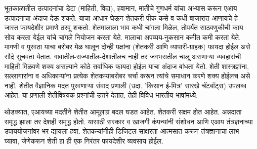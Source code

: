 भूतकाळातील उत्पादनांचा डेटा (माहिती, विदा), हवामान, मातीचे गुणधर्म यांचा अभ्यास करून एआय उत्पादनाचा अंदाज देऊ शकते. याचा आधार घेऊन शेतकरी पीक कसे व कधी बाजारात आणायचे हे जास्त फायदेशीर प्रमाणे ठरवू शकतो. शेतमालाला भाव कधी चांगला मिळेल, तोपर्यंत साठवणुकीची काय सोय करता येईल यांचे चांगले नियोजन करता येते. मालाचा अपव्यय-नुकसान कमीत कमी करता येते. मागणी व पुरवठा याचा बरोबर मेळ घालून दोन्ही पक्षांना (शेतकरी आणि व्यापारी-ग्राहक) फायदा होईल असे सौदे सुचवता येतात. गावातील-राज्यातील-देशातीलच नाही तर जगभरातील चालू असणाऱ्या व्यवहारांची माहिती मिळवणे शक्य असल्याने कोठे सर्वाधिक फायदा होईल याचा अंदाज बांधता येतो. शेती शास्त्रज्ञांना, सल्लागारांना व अधिकाऱ्यांना प्रत्येक शेतकऱ्याबरोबर चर्चा करून त्यांचे समाधान करणे शक्य होईलच असे नाही. शेतीत वैज्ञानिक मदत पुरवणाऱ्या संवाद प्रणाली (उदा. 'किसान ई-मित्र' सारखे चॅटबॉट्स) उपलब्ध आहेत. या प्रणाली शेतीविषयक प्रश्नांची उत्तरे देतात, तेही विविध भारतीय भाषांमध्ये.

थोडक्यात, एआयच्या मदतीने शेतीत आमूलाग्र बदल घडत आहेत. शेतकरी सक्षम होत आहेत. अन्नदाता समृद्ध झाला तर देशही समृद्ध होतो. यासाठी सरकार व खाजगी कंपन्यांनी संशोधन आणि एआय तंत्रज्ञनाच्या उपाययोजनांवर भर द्यायला हवा. शेतकऱ्यांनीही डिजिटल साक्षरता आत्मसात करून तंत्रज्ञानाचा लाभ घ्यावा, जेणेकरून शेती हा ही एक निरंतर फायदेशीर व्यवसाय होईल.